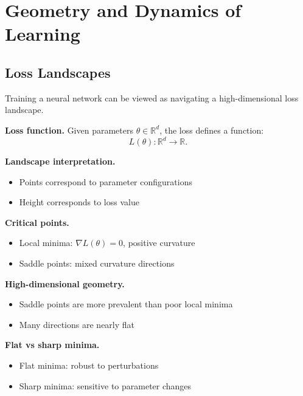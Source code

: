 \chapter{Geometry and Dynamics of Learning}

\section{Loss Landscapes}

Training a neural network can be viewed as navigating a high-dimensional loss landscape.

\medskip

\noindent
\textbf{Loss function.}  
Given parameters $\theta \in \mathbb{R}^d$, the loss defines a function:
\[
L(\theta): \mathbb{R}^d \to \mathbb{R}.
\]

\medskip

\noindent
\textbf{Landscape interpretation.}
\begin{itemize}
    \item Points correspond to parameter configurations
    \item Height corresponds to loss value
\end{itemize}

\medskip

\noindent
\textbf{Critical points.}
\begin{itemize}
    \item Local minima: $\nabla L(\theta) = 0$, positive curvature
    \item Saddle points: mixed curvature directions
\end{itemize}

\medskip

\noindent
\textbf{High-dimensional geometry.}
\begin{itemize}
    \item Saddle points are more prevalent than poor local minima
    \item Many directions are nearly flat
\end{itemize}

\medskip

\noindent
\textbf{Flat vs sharp minima.}
\begin{itemize}
    \item Flat minima: robust to perturbations
    \item Sharp minima: sensitive to parameter changes
\end{itemize}

\medskip

